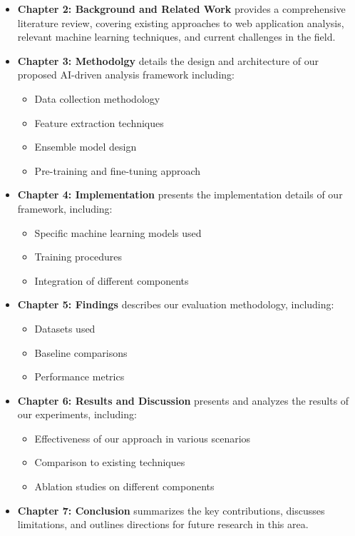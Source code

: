 \begin{itemize}

\item \textbf{Chapter 2: Background and Related Work} provides a comprehensive literature review, covering existing approaches to web application analysis, relevant machine learning techniques, and current challenges in the field.

\item \textbf{Chapter 3: Methodolgy} details the design and architecture of our proposed AI-driven analysis framework including:
\begin{itemize}
\item Data collection methodology
\item Feature extraction techniques
\item Ensemble model design 
\item Pre-training and fine-tuning approach
\end{itemize}

\item \textbf{Chapter 4: Implementation} presents the implementation details of our framework, including:
\begin{itemize}
\item Specific machine learning models used
\item Training procedures
\item Integration of different components
\end{itemize}

\item \textbf{Chapter 5: Findings} describes our evaluation methodology, including:
\begin{itemize}
\item Datasets used
\item Baseline comparisons
\item Performance metrics
\end{itemize}

\item \textbf{Chapter 6: Results and Discussion} presents and analyzes the results of our experiments, including:
\begin{itemize}
\item Effectiveness of our approach in various scenarios
\item Comparison to existing techniques
\item Ablation studies on different components
\end{itemize}

\item \textbf{Chapter 7: Conclusion} summarizes the key contributions, discusses limitations, and outlines directions for future research in this area.

\end{itemize}
